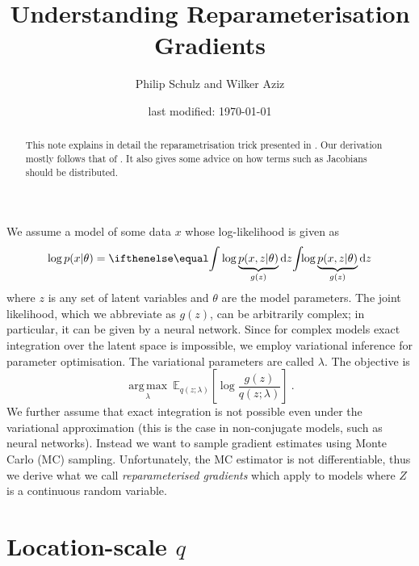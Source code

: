 \documentclass[a4paper,11pt]{article}
\author{Philip Schulz and Wilker Aziz}
\title{Understanding Reparameterisation Gradients}
\date{last modified: \today}
\DeclareMathOperator*{\argmax}{arg\,max}
\begin{document}
\maketitle

\begin{abstract}
This note explains in detail the reparametrisation trick presented in \citep{KingmaWelling:2013,RezendeEtAl:2014,TitsiasLazarogredilla:2014}. 
Our derivation mostly follows that of \citet{TitsiasLazarogredilla:2014}. It also gives some advice on how terms such as Jacobians should be distributed.
\end{abstract}


We assume a model of some data $ x $ whose log-likelihood is given as
\begin{equation}
\log p(x|\theta) = \intl { \log \underbrace{p(x,z|\theta)}_{g(z)} } {z} 
\end{equation}
where $ z $ is any set of latent variables and $ \theta $ are the model parameters. The joint likelihood, which we abbreviate as $ g(z) $, can be arbitrarily
complex; in particular, it can be given by a neural network. Since for complex models exact integration over the latent space is impossible, we employ variational
inference for parameter optimisation. The variational parameters are called $ \lambda $. The objective is
\begin{equation} \label{eq:objective}
\underset{\lambda}{\argmax} ~ \mathbb E_{q(z; \lambda)}\left[ \log \frac{g(z)}{q(z; \lambda)} \right] \ .
\end{equation}
We further assume that exact integration is not possible even under the variational approximation (this is the case in non-conjugate models, such as neural networks). Instead we want to sample gradient estimates using Monte Carlo (MC) sampling. Unfortunately, the MC estimator is not differentiable, thus we derive what we call \emph{reparameterised gradients} which apply to models where $Z$ is a continuous random variable.

\section{Location-scale $q$}
 
\end{document}
